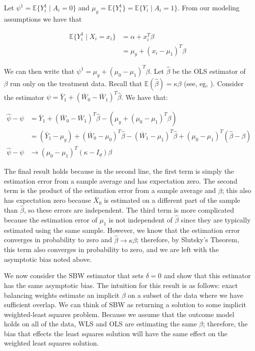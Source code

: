 \documentclass[12pt]{article}
\begin{document}
Let $\psi^1 = \mathbb{E}\{Y_i^1 \mid A_i = 0\}$ and $\mu_y = \mathbb{E}\{Y_i^1\} = \mathbb{E}\{Y_i \mid A_i = 1\}$. From our modeling assumptions we have that

\begin{align*}
    \mathbb{E}\{Y_i^1 \mid X_i = x_i\} &= \alpha + x_i^T\beta \\
    &= \mu_y + (x_i - \mu_1)^T\beta
\end{align*}

We can then write that $\psi^1 = \mu_y + (\mu_0 - \mu_1)^T\beta$. Let $\hat{\beta}$ be the OLS estimator of $\beta$ run only on the treatment data. Recall that $\mathbb{E}(\hat{\beta}) = \kappa\beta$ (see, eg, \cite{gleser1992importance}). Consider the estimator $\hat{\psi} = \bar{Y}_1 + (\bar{W}_0 - \bar{W}_1)^T\hat{\beta}$. We have that: 

\begin{align*}
    \hat{\psi} - \psi &= \bar{Y}_1 + (\bar{W}_0 - \bar{W}_1)^T\hat{\beta} - (\mu_y + (\mu_0 - \mu_1)^T\beta) \\
    &= (\bar{Y}_1 - \mu_y) + (\bar{W}_0 - \mu_0)^T\hat{\beta} - (\bar{W}_1 - \mu_1)^T\hat{\beta} + (\mu_0 - \mu_1)^T(\hat{\beta} - \beta) \\
    \hat{\psi} - \psi &\to (\mu_0 - \mu_1)^T(\kappa - I_d)\beta
\end{align*}

The final result holds because in the second line, the first term is simply the estimation error from a sample average and has expectation zero. The second term is the product of the estimation error from a sample average and $\hat{\beta}$; this also has expectation zero because $\bar{X}_0$ is estimated on a different part of the sample than $\hat{\beta}$, so these errors are independent. The third term is more complicated because the estimation error of $\mu_1$ is not independent of $\hat{\beta}$ since they are typically estimated using the same sample. However, we know that the estimation error converges in probability to zero and $\hat{\beta} \to \kappa\beta$; therefore, by Slutsky's Theorem, this term also converges in probability to zero, and we are left with the asymptotic bias noted above. 

We now consider the SBW estimator that sets $\delta = 0$ and show that this estimator has the same asymptotic bias. The intuition for this result is as follows: exact balancing weights estimate an implicit $\beta$ on a subset of the data where we have sufficient overlap. We can think of SBW as returning a solution to some implicit weighted-least squares problem. Because we assume that the outcome model holds on all of the data, WLS and OLS are estimating the same $\beta$; therefore, the bias that effects the least squares solution will have the same effect on the weighted least squares solution.
\end{document}
